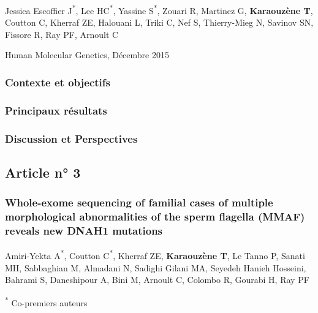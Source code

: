 \documentclass[12pt,twoside]{reedthesis}
\theoremstyle{definition}
\theoremstyle{definition}
\theoremstyle{remark}
\begin{document}
  Jessica Escoffier J\textsuperscript{*}, Lee HC\textsuperscript{*},
  Yassine S\textsuperscript{*}, Zouari R, Martinez G, \textbf{Karaouzène
  T}, Coutton C, Kherraf ZE, Halouani L, Triki C, Nef S, Thierry-Mieg N,
  Savinov SN, Fissore R, Ray PF, Arnoult C
  
  Human Molecular Genetics, Décembre 2015
  
  \newpage
  
  \subsubsection{Contexte et objectifs}\label{contexte-et-objectifs-1}
  
  \newpage
  
  
  
  \newpage
  
  \subsubsection{Principaux résultats}\label{principaux-resultats-1}
  
  \subsubsection{Discussion et
  Perspectives}\label{discussion-et-perspectives-1}
  
  \subsection{Article n° 3}\label{article-n-3}
  
  \subsubsection{Whole-exome sequencing of familial cases of multiple
  morphological abnormalities of the sperm flagella (MMAF) reveals new
  DNAH1
  mutations}\label{whole-exome-sequencing-of-familial-cases-of-multiple-morphological-abnormalities-of-the-sperm-flagella-mmaf-reveals-new-dnah1-mutations}
  
  Amiri-Yekta A\textsuperscript{*}, Coutton C\textsuperscript{*}, Kherraf
  ZE, \textbf{Karaouzène T}, Le Tanno P, Sanati MH, Sabbaghian M, Almadani
  N, Sadighi Gilani MA, Seyedeh Hanieh Hosseini, Bahrami S, Daneshipour A,
  Bini M, Arnoult C, Colombo R, Gourabi H, Ray PF
  
  \textsuperscript{*} Co-premiers auteurs
  
\end{document}
